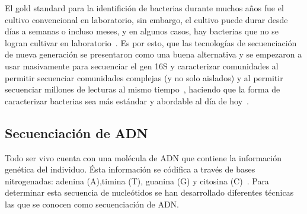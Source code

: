 El gold standard para la identifición de bacterias durante muchos años fue el cultivo convencional en laboratorio, sin embargo, el cultivo puede durar desde días a semanas o incluso meses, y en algunos casos, hay bacterias que no se logran cultivar en laboratorio~\cite{didelot2012transforming}. 
Es por esto, que las tecnologías de secuenciación de nueva generación se presentaron como una buena alternativa y se empezaron a usar masivamente para secuenciar el gen 16S y caracterizar comunidades al permitir secuenciar comunidades complejas (y no solo aislados) y al permitir secuenciar millones de lecturas al mismo tiempo~\cite{reller2007detection}, haciendo que la forma de caracterizar bacterias sea más estándar y abordable al día de hoy~\cite{woo2008then, tanner1994impact}. 





\subsection{Secuenciación de ADN}
Todo ser vivo cuenta con una molécula de ADN que contiene la información genética del individuo. Ésta información se códifica a través de bases nitrogenadas: adenina (A),timina (T), guanina (G) y citosina (C)~\cite{watson1953molecular}. 
Para determinar esta secuencia de nucleótidos se han desarrollado diferentes técnicas las que se conocen como secuenciación de ADN. 

